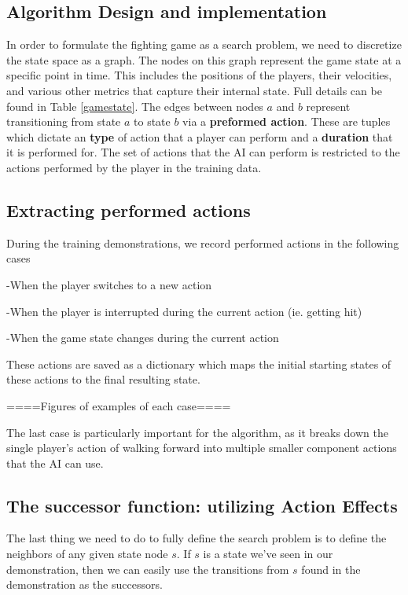 \documentclass{article}
\begin{document}
\subsection{Algorithm Design and implementation}
In order to formulate the fighting game as a search problem, we need to discretize the state space as a graph. The nodes on this graph represent the game state at a specific point in time. This includes the positions of the players, their velocities, and various other metrics that capture their internal state. Full details can be found in Table \ref{gamestate}. The edges between nodes $a$ and $b$ represent transitioning from state $a$ to state $b$ via a \textbf{preformed action}. These are tuples which dictate an \textbf{type} of action that a player can perform and a \textbf{duration} that it is performed for. The set of actions that the AI can perform is restricted to the actions performed by the player in the training data. 

\subsection{Extracting performed actions}

During the training demonstrations, we record performed actions in the following cases

-When the player switches to a new action

-When the player is interrupted during the current action (ie. getting hit)

-When the game state changes during the current action

These actions are saved as a dictionary which maps the initial starting states of these actions to the final resulting state.

====Figures of examples of each case====

The last case is particularly important for the algorithm, as it breaks down the single player's action of walking forward into multiple smaller component actions that the AI can use.

\subsection{The successor function: utilizing Action Effects}

The last thing we need to do to fully define the search problem is to define the neighbors of any given state node $s$. If $s$ is a state we've seen in our demonstration, then we can easily use the transitions from $s$ found in the demonstration as the successors. 
\end{document}
